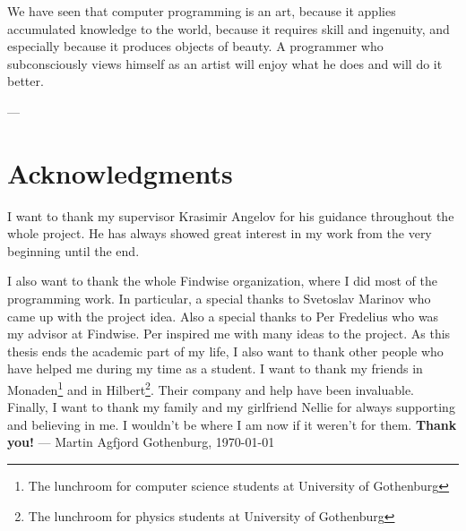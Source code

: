 
\vspace{30mm}
\begin{flushleft}{\slshape

We have seen that computer programming is an art, because it applies accumulated knowledge to the world, because it requires skill and ingenuity, and especially
    because it produces objects of beauty. A programmer who
    subconsciously views himself as an artist will enjoy what he does and will do it better.} \medskip
\end{flushleft}
\begin{flushright}
---  \citep{knuth:1974}
\end{flushright}



\bigskip

\begingroup
\let\clearpage\relax
\let\cleardoublepage\relax
\let\cleardoublepage\relax
\chapter*{Acknowledgments}
I want to thank my supervisor Krasimir Angelov for his guidance throughout the whole project. He has always showed great interest in my work from the very beginning until the end. 

I also want to thank the whole Findwise organization, where I did most of the programming work. In particular, a special thanks to Svetoslav Marinov who came up with the project idea. Also a special thanks to Per Fredelius who was my advisor at Findwise. Per inspired me with many ideas to the project. 
\newline
\newline
As this thesis ends the academic part of my life, I also want to thank other people who have helped me during my time as a student.
\newline
\newline
I want to thank my friends in Monaden\footnote{The lunchroom for computer science students at University of Gothenburg} and in Hilbert\footnote{The lunchroom for physics students at University of Gothenburg}. Their company and help have been invaluable.
\newline
\newline
Finally, I want to thank my family and my girlfriend Nellie for always supporting and believing in me. I wouldn't be where I am now if it weren't for them.
\newline
\newline
\newline
\newline
\textbf{Thank you!}
\newline
\newline
---
\newline
Martin Agfjord
\newline
Gothenburg, \today
\endgroup



